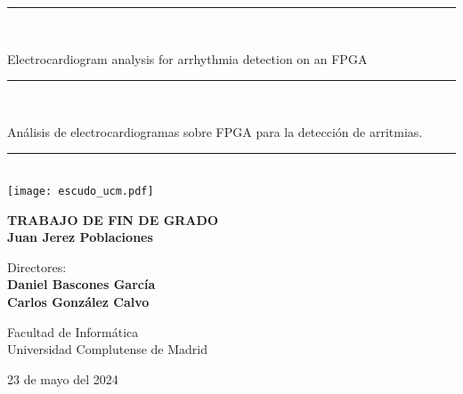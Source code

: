 \begin{titlepage}
	\thispagestyle{empty}

	\begin{center}

		\vspace{1cm}

		\vspace{0.65cm}
		\rule{2in}{0.5pt}\\
		\vspace{0.85cm}

		{\Large Electrocardiogram analysis for arrhythmia detection on an FPGA}\\

		\vspace{0.65cm}
		\rule{2in}{0.5pt}\\
		\vspace{0.85cm}

		{\Large Análisis de electrocardiogramas sobre FPGA para la detección de arritmias.}\\

		\vspace{0.65cm}
		\rule{2in}{0.5pt}\\



		\vfill
		\texttt{[image: escudo\_ucm.pdf]}
		\vfill

		

		\textbf{TRABAJO DE FIN DE GRADO}\\
		\vspace{0.7cm}
		\textbf{Juan Jerez Poblaciones}

		\vspace{1cm}

		Directores:\\
		\textbf{Daniel Bascones García}\\
		\textbf{Carlos González Calvo}

		\vspace{1.8cm}
		Facultad de Informática\\
		Universidad Complutense de Madrid
		\vspace{0.5cm}
	   
		23 de mayo del 2024

		\vspace{0.2cm}

	\end{center}
\end{titlepage}